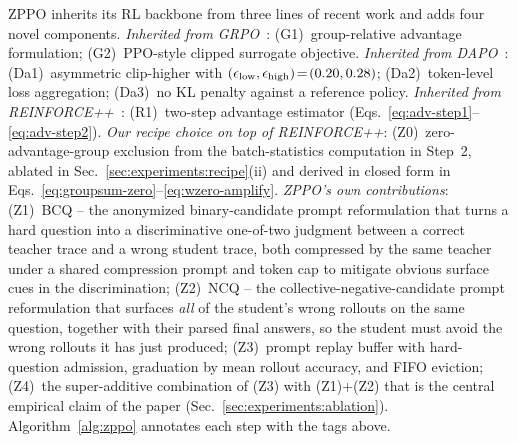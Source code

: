 \documentclass{llmxive}
\begin{document}
ZPPO inherits its RL backbone from three lines of recent work and adds four novel components. \emph{Inherited from GRPO~\citep{shao2024deepseekmath}}: (G1)~group-relative advantage formulation; (G2)~PPO-style clipped surrogate objective. \emph{Inherited from DAPO~\citep{yu2025dapo}}: (Da1)~asymmetric clip-higher with $(\epsilon_{\rm low},\epsilon_{\rm high})\!=\!(0.20, 0.28)$; (Da2)~token-level loss aggregation; (Da3)~no KL penalty against a reference policy. \emph{Inherited from REINFORCE++~\citep{hu2025reinforce++}}: (R1)~two-step advantage estimator (Eqs.~\ref{eq:adv-step1}--\ref{eq:adv-step2}). \emph{Our recipe choice on top of REINFORCE++}: (Z0)~zero-advantage-group exclusion from the batch-statistics computation in Step~2, ablated in Sec.~\ref{sec:experiments:recipe}(ii) and derived in closed form in Eqs.~\ref{eq:groupsum-zero}--\ref{eq:wzero-amplify}. \emph{ZPPO's own contributions}: (Z1)~BCQ -- the anonymized binary-candidate prompt reformulation that turns a hard question into a discriminative one-of-two judgment between a correct teacher trace and a wrong student trace, both compressed by the same teacher under a shared compression prompt and token cap to mitigate obvious surface cues in the discrimination; (Z2)~NCQ -- the collective-negative-candidate prompt reformulation that surfaces \emph{all} of the student's wrong rollouts on the same question, together with their parsed final answers, so the student must avoid the wrong rollouts it has just produced; (Z3)~prompt replay buffer with hard-question admission, graduation by mean rollout accuracy, and FIFO eviction; (Z4)~the super-additive combination of (Z3) with (Z1)+(Z2) that is the central empirical claim of the paper (Sec.~\ref{sec:experiments:ablation}). Algorithm~\ref{alg:zppo} annotates each step with the tags above.
\end{document}
